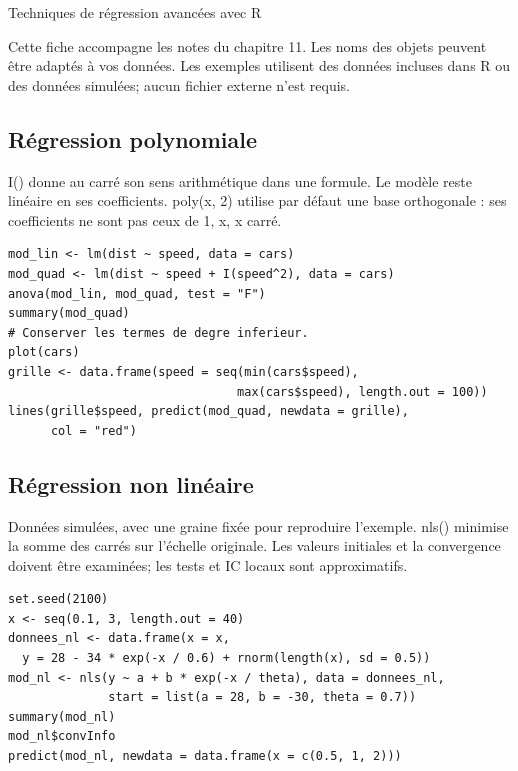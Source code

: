 \documentclass[letterpaper,11pt]{article}
\begin{document}
\begin{center}{\Large Techniques de régression avancées avec R}\end{center}
Cette fiche accompagne les notes du chapitre 11. Les noms des objets peuvent être adaptés à vos données. Les exemples utilisent des données incluses dans R ou des données simulées; aucun fichier externe n’est requis.

\par\medskip\noindent\begin{minipage}{\linewidth}
\subsection*{Régression polynomiale}
I() donne au carré son sens arithmétique dans une formule. Le modèle reste linéaire en ses coefficients. poly(x, 2) utilise par défaut une base orthogonale : ses coefficients ne sont pas ceux de 1, x, x carré.
\begin{Verbatim}
mod_lin <- lm(dist ~ speed, data = cars)
mod_quad <- lm(dist ~ speed + I(speed^2), data = cars)
anova(mod_lin, mod_quad, test = "F")
summary(mod_quad)
# Conserver les termes de degre inferieur.
plot(cars)
grille <- data.frame(speed = seq(min(cars$speed),
                                max(cars$speed), length.out = 100))
lines(grille$speed, predict(mod_quad, newdata = grille),
      col = "red")
\end{Verbatim}

\end{minipage}\par
\par\medskip\noindent\begin{minipage}{\linewidth}
\subsection*{Régression non linéaire}
Données simulées, avec une graine fixée pour reproduire l'exemple. nls() minimise la somme des carrés sur l'échelle originale. Les valeurs initiales et la convergence doivent être examinées; les tests et IC locaux sont approximatifs.
\begin{Verbatim}
set.seed(2100)
x <- seq(0.1, 3, length.out = 40)
donnees_nl <- data.frame(x = x,
  y = 28 - 34 * exp(-x / 0.6) + rnorm(length(x), sd = 0.5))
mod_nl <- nls(y ~ a + b * exp(-x / theta), data = donnees_nl,
              start = list(a = 28, b = -30, theta = 0.7))
summary(mod_nl)
mod_nl$convInfo
predict(mod_nl, newdata = data.frame(x = c(0.5, 1, 2)))
\end{Verbatim}

\end{minipage}\par
\end{document}
